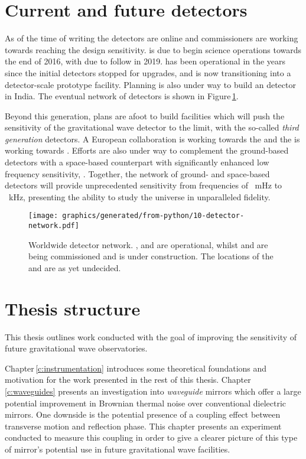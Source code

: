 \section{Current and future detectors}
As of the time of writing the \ALIGO{} detectors are online and commissioners are working towards reaching the design sensitivity. \AVIRGO{} is due to begin science operations towards the end of 2016, with \KAGRA{} due to follow in 2019. \GEOHF{} has been operational in the years since the initial detectors stopped for upgrades, and is now transitioning into a detector-scale prototype facility. Planning is also under way to build an \ALIGO{} detector in India. The eventual network of detectors is shown in Figure\,\ref{fig:detector-network}.

Beyond this generation, plans are afoot to build facilities which will push the sensitivity of the gravitational wave detector to the limit, with the so-called \emph{third generation} detectors. A European collaboration is working towards the \emph{\ET{}} \cite{ET2011} and the \LSC{} is working towards \emph{\LIGOCE{}} \cite{Dwyer2015}. Efforts are also under way to complement the ground-based detectors with a space-based counterpart with significantly enhanced low frequency sensitivity, \emph{\ELISA{}} \cite{Amaro-Seoane2012}. Together, the network of ground- and space-based detectors will provide unprecedented sensitivity from frequencies of \SI{}{\milli\hertz} to \SI{}{\kilo\hertz}, presenting the ability to study the universe in unparalleled fidelity.

\begin{figure}
  \centering
  \texttt{[image: graphics/generated/from-python/10-detector-network.pdf]}
  \caption[Worldwide detector network]{\label{fig:detector-network}Worldwide detector network. \GEO{}, \LHO{} and \LLO{} are operational, whilst \VIRGO{} and \KAGRA{} are being commissioned and \INDIGO{} is under construction. The locations of the \ET{} and \LIGOCE{} are as yet undecided.}
\end{figure}

\section{Thesis structure}
This thesis outlines work conducted with the goal of improving the sensitivity of future gravitational wave observatories.

Chapter\,\ref{c:instrumentation} introduces some theoretical foundations and motivation for the work presented in the rest of this thesis. Chapter\,\ref{c:waveguides} presents an investigation into \emph{waveguide} mirrors which offer a large potential improvement in Brownian thermal noise over conventional dielectric mirrors. One downside is the potential presence of a coupling effect between transverse motion and reflection phase. This chapter presents an experiment conducted to measure this coupling in order to give a clearer picture of this type of mirror's potential use in future gravitational wave facilities.

